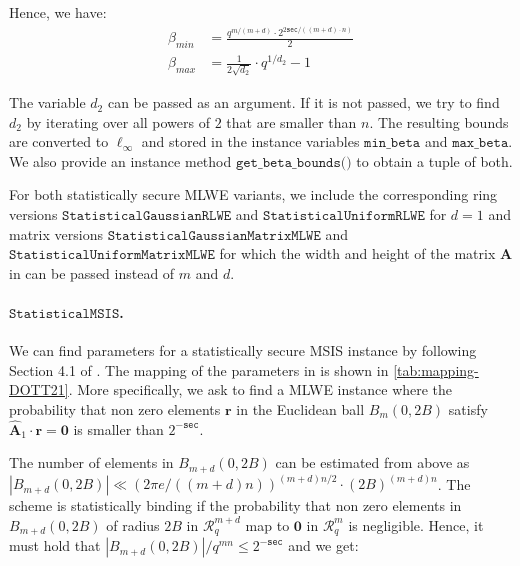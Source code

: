 Hence, we have:
\begin{align}
    \beta_{min} & = \frac{q^{m/(m+d)} \cdot 2^{2 \texttt{sec}/((m+d)\cdot n)}}{2} \\
    \beta_{max} & = \frac{1}{2\sqrt{d_2}} \cdot q^{1/d_2} - 1
\end{align}

The variable $d_2$ can be passed as an argument. If it is not passed, we try to find $d_2$ by iterating over all powers of $2$ that are smaller than $n$.
The resulting bounds are converted to $\ell_\infty$ and stored in the instance variables $\texttt{min\_beta}$ and $\texttt{max\_beta}$. We also provide an instance method $\texttt{get\_beta\_bounds()}$ to obtain a tuple of both.

For both statistically secure MLWE variants, we include the corresponding ring versions $\texttt{StatisticalGaussianRLWE}$ and $\texttt{StatisticalUniformRLWE}$ for $d=1$ and matrix versions $\texttt{StatisticalGaussianMatrixMLWE}$ and $\texttt{StatisticalUniformMatrixMLWE}$ for which the width and height of the matrix $\mathbf{A}$ in \cite{LPR13} can be passed instead of $m$ and $d$. %


\paragraph{$\texttt{StatisticalMSIS}$.} We can find parameters for a statistically secure MSIS instance by following Section 4.1 of \cite{DOTT21}. The mapping of the parameters in \cite{DOTT21} is shown in \cref{tab:mapping-DOTT21}. More specifically, we ask to find a MLWE instance where the probability that non zero elements $\mathbf{r}$ in the Euclidean ball $B_{m}(0, 2B)$ satisfy $\hat{\mathbf{A}}_1 \cdot \mathbf{r} = \mathbf{0}$ is smaller than $2^{-\texttt{sec}}$. %

The number of elements in $B_{m+d}(0, 2B)$ can be estimated from above as $|B_{m+d}(0, 2B)| \ll (2 \pi e /((m+d) n))^{(m+d) n/2} \cdot (2 B)^{(m+d) n}$. The scheme is statistically binding if the probability that non zero elements in $B_{m+d}(0, 2B)$ of radius $2B$ in $\mathcal{R}_q^{m+d}$ map to $\mathbf{0}$ in $\mathcal{R}_q^{m}$ is negligible. Hence, it must hold that $|B_{m+d}(0, 2B)|/q^{m n} \leq 2^{-\texttt{sec}}$ and we get:

